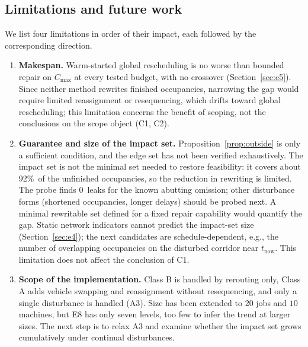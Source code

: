 \documentclass[manuscript,screen,review]{acmart}
\newcommand{\ClosureAliveFrac}{92\%}
\newcommand{\ScaleJobsHi}{20}
\newcommand{\ScaleMachHi}{10}
\newcommand{\ProbeLeaks}{0}
\begin{document}
\subsection{Limitations and future work}
\label{sec:limitations}
\label{sec:future}

We list four limitations in order of their impact, each followed by the corresponding direction.

\begin{enumerate}[leftmargin=1.6em,itemsep=0.3em]
\item \textbf{Makespan.} Warm-started global rescheduling is no worse than bounded repair on \(C_{\max}\) at every tested budget, with no crossover (Section~\ref{sec:e5}).
Since neither method rewrites finished occupancies, narrowing the gap would require limited reassignment or resequencing, which drifts toward global rescheduling; this limitation concerns the benefit of scoping, not the conclusions on the scope object (C1, C2).

\item \textbf{Guarantee and size of the impact set.} Proposition~\ref{prop:outside} is only a sufficient condition, and the edge set has not been verified exhaustively. The impact set is not the minimal set needed to restore feasibility: it covers about \ClosureAliveFrac\ of the unfinished occupancies, so the reduction in rewriting is limited.
The probe finds \ProbeLeaks\ leaks for the known abutting omission; other disturbance forms (shortened occupancies, longer delays) should be probed next.
A minimal rewritable set defined for a fixed repair capability would quantify the gap.
Static network indicators cannot predict the impact-set size (Section~\ref{sec:e4}); the next candidates are schedule-dependent, e.g., the number of overlapping occupancies on the disturbed corridor near \(t_{\mathrm{now}}\). This limitation does not affect the conclusion of C1.

\item \textbf{Scope of the implementation.} Class B is handled by rerouting only, Class A adds vehicle swapping and reassignment without resequencing, and only a single disturbance is handled (A3).
Size has been extended to \(\ScaleJobsHi\) jobs and \(\ScaleMachHi\) machines, but E8 has only seven levels, too few to infer the trend at larger sizes.
The next step is to relax A3 and examine whether the impact set grows cumulatively under continual disturbances.


\end{enumerate}
\end{document}
